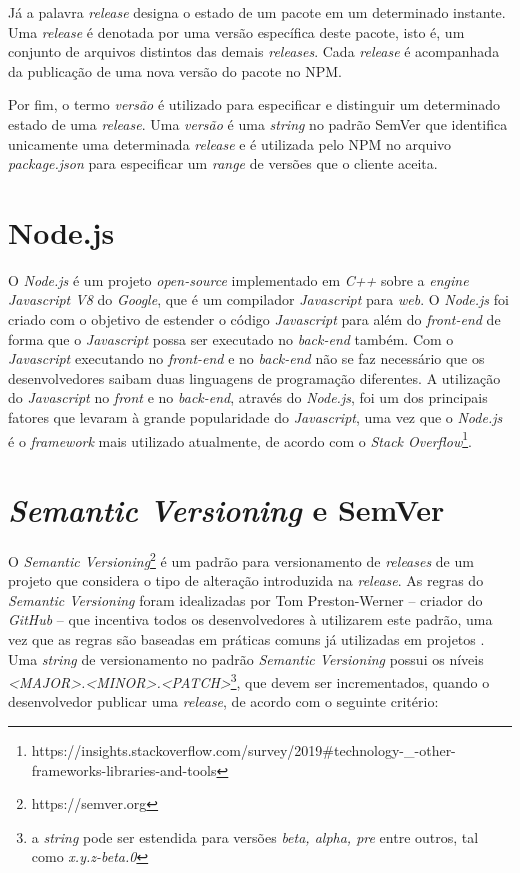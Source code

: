 Já a palavra \textit{release} designa o estado de um pacote em um determinado instante. Uma \textit{release} é denotada por uma versão específica deste pacote, isto é, um conjunto de arquivos distintos das demais \textit{releases}. Cada \textit{release} é acompanhada da publicação de uma nova versão do pacote no \gls{NPM}.

Por fim, o termo \textit{versão} é utilizado para especificar e distinguir um determinado estado de uma \textit{release}. Uma \textit{versão} é uma \textit{string} no padrão \gls{SemVer} que identifica unicamente uma determinada \textit{release} e é utilizada pelo \gls{NPM} no arquivo \textit{package.json} para especificar um \textit{range} de versões que o cliente aceita.

\section{Node.js}
\label{ref-teo:node}
O \textit{Node.js} é um projeto \textit{open-source} implementado em \textit{C++} sobre a \textit{engine Javascript V8} do \textit{Google}, que é um compilador \textit{Javascript} para \textit{web}. O \textit{Node.js} foi criado com o objetivo de estender o código \textit{Javascript} para além do \textit{front-end} de forma que o \textit{Javascript} possa ser executado no \textit{back-end} também. Com o \textit{Javascript} executando no \textit{front-end} e no \textit{back-end} não se faz necessário que os desenvolvedores saibam duas linguagens de programação diferentes. A utilização do \textit{Javascript} no \textit{front} e no \textit{back-end}, através do \textit{Node.js}, foi um dos principais fatores que levaram à grande popularidade do \textit{Javascript}, uma vez que o \textit{Node.js} é o \textit{framework} mais utilizado atualmente, de acordo com o \textit{Stack Overflow}\footnote{https://insights.stackoverflow.com/survey/2019\#technology-\_-other-frameworks-libraries-and-tools}.

\section{\textit{Semantic Versioning} e \gls{SemVer}}
\label{ref-teo:semver}
O \textit{Semantic Versioning}\footnote{https://semver.org} é um padrão para versionamento de \textit{releases} de um projeto que considera o tipo de alteração introduzida na \textit{release}. As regras do \textit{Semantic Versioning} foram idealizadas por Tom Preston-Werner -- criador do \textit{GitHub} -- que incentiva todos os desenvolvedores à utilizarem este padrão, uma vez que as regras são baseadas em práticas comuns já utilizadas em projetos \cite{teorical_reference:semver}. Uma \textit{string} de versionamento no padrão \textit{Semantic Versioning} possui os níveis \textit{<MAJOR>.<MINOR>.<PATCH>}\footnote{a \textit{string} pode ser estendida para versões \textit{beta, alpha, pre} entre outros, tal como \textit{x.y.z-beta.0}}, que devem ser incrementados, quando o desenvolvedor publicar uma \textit{release}, de acordo com o seguinte critério:

